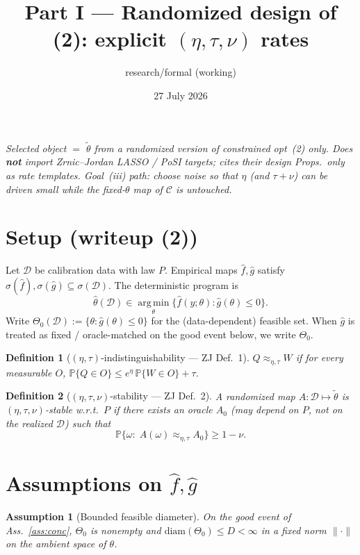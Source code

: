 \documentclass[11pt]{article}
\title{Part I --- Randomized design of (2): explicit $(\eta,\tau,\nu)$ rates}
\author{research/formal (working)}
\date{27 July 2026}
\newtheorem{definition}{Definition}
\newtheorem{assumption}{Assumption}
\begin{document}
\maketitle

\noindent\textit{Selected object $=$ $\tilde\theta$ from a randomized version of constrained opt~(2) only.
Does \textbf{not} import Zrnic--Jordan LASSO / PoSI targets; cites their design Props.\ only as rate templates.
Goal~(iii) path: choose noise so that $\eta$ (and $\tau+\nu$) can be driven small while the fixed-$\theta$ map of $\mathcal{C}$ is untouched.}

\section{Setup (writeup (2))}

Let $\mathcal{D}$ be calibration data with law $P$. Empirical maps $\hat f,\hat g$ satisfy
$\sigma(\hat f),\sigma(\hat g)\subseteq\sigma(\mathcal{D})$. The deterministic program is
\begin{equation}
\hat\theta(\mathcal{D})
\in
\operatorname*{arg\,min}_{\theta}
\bigl\{\hat f(y;\theta):\hat g(\theta)\le 0\bigr\}.
\tag{2}
\end{equation}
Write $\Theta_0(\mathcal{D}):=\{\theta:\hat g(\theta)\le 0\}$ for the (data-dependent) feasible set.
When $\hat g$ is treated as fixed / oracle-matched on the good event below, we write $\Theta_0$.

\begin{definition}[$(\eta,\tau)$-indistinguishability --- ZJ Def.~1]
\label{def:indist}
$Q\approx_{\eta,\tau} W$ if for every measurable $O$,
$\mathbb{P}\{Q\in O\}\le e^\eta\,\mathbb{P}\{W\in O\}+\tau$.
\end{definition}

\begin{definition}[$(\eta,\tau,\nu)$-stability --- ZJ Def.~2]
\label{def:zj-stable}
A randomized map $A:\mathcal{D}\mapsto\tilde\theta$ is $(\eta,\tau,\nu)$-stable w.r.t.\ $P$ if there
exists an oracle $A_0$ (may depend on $P$, \emph{not} on the realized $\mathcal{D}$) such that
\[
\mathbb{P}\bigl\{\omega:\; A(\omega)\approx_{\eta,\tau} A_0\bigr\}\ge 1-\nu.
\]
\end{definition}

\section{Assumptions on $\hat f,\hat g$}

\begin{assumption}[Bounded feasible diameter]
\label{ass:diam}
On the good event of Ass.~\ref{ass:conc}, $\Theta_0$ is nonempty and
$\mathrm{diam}(\Theta_0)\le D<\infty$ in a fixed norm $\|\cdot\|$ on the ambient space of $\theta$.
\end{assumption}
\end{document}
